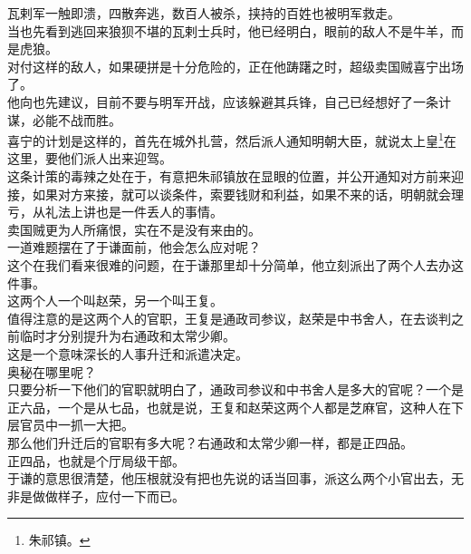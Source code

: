 \begin{multicols}{\theparacolNo}
瓦剌军一触即溃，四散奔逃，数百人被杀，挟持的百姓也被明军救走。\\

当也先看到逃回来狼狈不堪的瓦剌士兵时，他已经明白，眼前的敌人不是牛羊，而是虎狼。\\

对付这样的敌人，如果硬拼是十分危险的，正在他踌躇之时，超级卖国贼喜宁出场了。\\

他向也先建议，目前不要与明军开战，应该躲避其兵锋，自己已经想好了一条计谋，必能不战而胜。\\

喜宁的计划是这样的，首先在城外扎营，然后派人通知明朝大臣，就说太上皇\footnote{朱祁镇。}在这里，要他们派人出来迎驾。\\

这条计策的毒辣之处在于，有意把朱祁镇放在显眼的位置，并公开通知对方前来迎接，如果对方来接，就可以谈条件，索要钱财和利益，如果不来的话，明朝就会理亏，从礼法上讲也是一件丢人的事情。\\

卖国贼更为人所痛恨，实在不是没有来由的。\\

一道难题摆在了于谦面前，他会怎么应对呢？\\

这个在我们看来很难的问题，在于谦那里却十分简单，他立刻派出了两个人去办这件事。\\

这两个人一个叫赵荣，另一个叫王复。\\

值得注意的是这两个人的官职，王复是通政司参议，赵荣是中书舍人，在去谈判之前临时才分别提升为右通政和太常少卿。\\

这是一个意味深长的人事升迁和派遣决定。\\

奥秘在哪里呢？\\

只要分析一下他们的官职就明白了，通政司参议和中书舍人是多大的官呢？一个是正六品，一个是从七品，也就是说，王复和赵荣这两个人都是芝麻官，这种人在下层官员中一抓一大把。\\

那么他们升迁后的官职有多大呢？右通政和太常少卿一样，都是正四品。\\

正四品，也就是个厅局级干部。\\

于谦的意思很清楚，他压根就没有把也先说的话当回事，派这么两个小官出去，无非是做做样子，应付一下而已。\\


\end{multicols}
